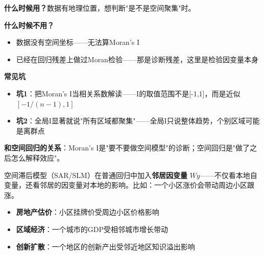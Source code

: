 \begin{algonotes}
\textbf{什么时候用？}数据有地理位置，想判断"是不是空间聚集"时。

\textbf{什么时候不用？}
\begin{itemize}
    \item 数据没有空间坐标——无法算Moran's I
    \item 已经在回归残差上做过Moran检验——那是诊断残差，这里是检验因变量本身
\end{itemize}

\textbf{常见坑}
\begin{itemize}
    \item \textbf{坑1}：把Moran's I当相关系数解读——I的取值范围不是[-1,1]，而是近似$[-1/(n-1), 1]$
    \item \textbf{坑2}：全局I显著就说"所有区域都聚集"——全局I只说整体趋势，个别区域可能是离群点
\end{itemize}

\textbf{和空间回归的关系}：Moran's I是"要不要做空间模型"的诊断；空间回归是"做了之后怎么解释效应"。
\end{algonotes}


\begin{algointro}
空间滞后模型（SAR/SLM）在普通回归中加入\textbf{邻居因变量} $Wy$——不仅看本地自变量，还看邻居的因变量对本地的影响。比如：一个小区涨价会带动周边小区跟涨。
\end{algointro}

\begin{algoscene}
\begin{itemize}
    \item \textbf{房地产估价}：小区挂牌价受周边小区价格影响
    \item \textbf{区域经济}：一个城市的GDP受相邻城市增长带动
    \item \textbf{创新扩散}：一个地区的创新产出受邻近地区知识溢出影响
\end{itemize}
\end{algoscene}

